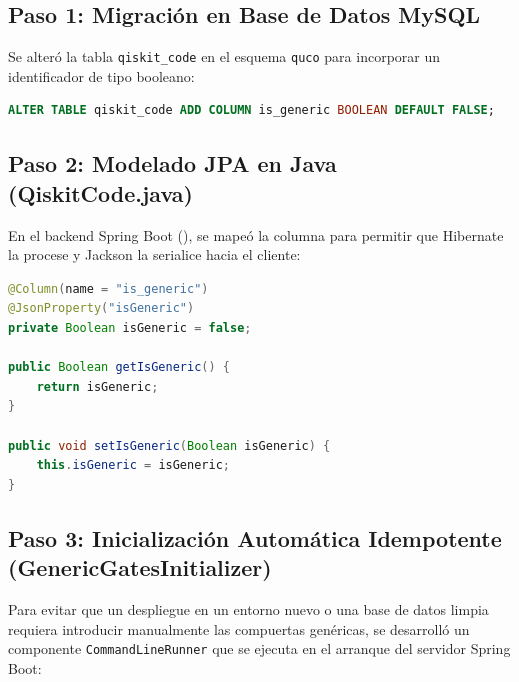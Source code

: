 \documentclass[11pt,a4paper]{article}
\begin{document}
\subsection{Paso 1: Migración en Base de Datos MySQL}
Se alteró la tabla \texttt{qiskit\_code} en el esquema \texttt{quco} para incorporar un identificador de tipo booleano:
\begin{lstlisting}[language=SQL, caption={Script DDL ejecutado en MySQL}]
ALTER TABLE qiskit_code ADD COLUMN is_generic BOOLEAN DEFAULT FALSE;
\end{lstlisting}

\subsection{Paso 2: Modelado JPA en Java (QiskitCode.java)}
En el backend Spring Boot (), se mapeó la columna para permitir que Hibernate la procese y Jackson la serialice hacia el cliente:

\begin{lstlisting}[language=Java, caption={Definicion de atributo en la entidad QiskitCode.java}]
@Column(name = "is_generic")
@JsonProperty("isGeneric")
private Boolean isGeneric = false;

public Boolean getIsGeneric() {
    return isGeneric;
}

public void setIsGeneric(Boolean isGeneric) {
    this.isGeneric = isGeneric;
}
\end{lstlisting}

\subsection{Paso 3: Inicialización Automática Idempotente (GenericGatesInitializer)}
Para evitar que un despliegue en un entorno nuevo o una base de datos limpia requiera introducir manualmente las compuertas genéricas, se desarrolló un componente \texttt{CommandLineRunner} que se ejecuta en el arranque del servidor Spring Boot:
\end{document}
